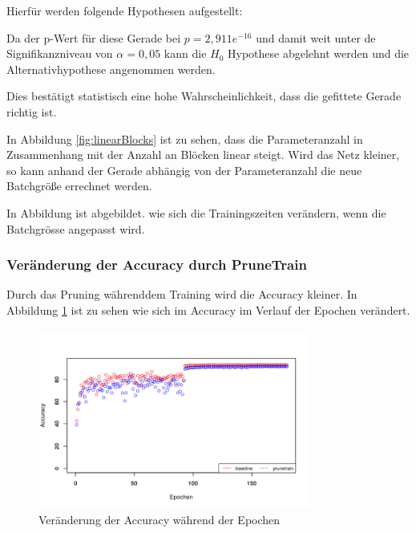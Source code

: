 Hierfür werden folgende Hypothesen aufgestellt:


Da der p-Wert für diese Gerade bei $p=2,911e^{-16}$ und damit weit unter de Signifikanzniveau von $\alpha=0,05$ kann die $H_0$ Hypothese abgelehnt werden und die Alternativhypothese angenommen werden.

Dies bestätigt statistisch eine hohe Wahrscheinlichkeit, dass die gefittete Gerade richtig ist.



In Abbildung \ref{fig:linearBlocks} ist zu sehen, dass die Parameteranzahl in Zusammenhang mit der Anzahl an Blöcken linear steigt.
Wird das Netz kleiner, so kann anhand der Gerade abhängig von der Parameteranzahl die neue Batchgröße errechnet werden.







In Abbildung  ist abgebildet. wie sich die Trainingszeiten verändern, wenn die Batchgrösse angepasst wird.



\subsubsection{Veränderung der Accuracy durch PruneTrain}

Durch das Pruning währenddem Training wird die Accuracy kleiner. In Abbildung \ref{abb:PTaccuracy} ist zu sehen wie sich im Accuracy im Verlauf der Epochen verändert.  

\begin{figure}[h]
 \centering
 \includegraphics[width=0.8\textwidth]{KapitelPartB/Images/PTaccuracy.png}
 \caption{Veränderung der Accuracy während der Epochen}
 \label{abb:PTaccuracy}
\end{figure}

